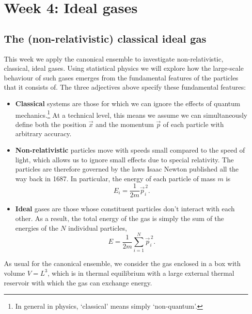 \renewcommand{\thisweek}{MATH327 Week 4}
\renewcommand{\moddate}{Last modified 31 Jan.~2021}
\setcounter{section}{4}
\setcounter{subsection}{0}
{}
\section*{Week 4: Ideal gases}

\subsection{The (non-relativistic) classical ideal gas}
This week we apply the canonical ensemble to investigate non-relativistic, classical, ideal gases.
Using statistical physics we will explore how the large-scale behaviour of such gases emerges from the fundamental features of the particles that it consists of.
The three adjectives above specify these fundamental features: \\[-24 pt]
\begin{itemize}
  \item \textbf{Classical} systems are those for which we can ignore the effects of quantum mechanics.\footnote{In general in physics, `classical' means simply `non-quantum'.}
        At a technical level, this means we assume we can simultaneously define both the position $\vec x$ and the momentum $\vec p$ of each particle with arbitrary accuracy.
  \item \textbf{Non-relativistic} particles move with speeds small compared to the speed of light, which allows us to ignore small effects due to special relativity.
        The particles are therefore governed by the laws Isaac Newton published all the way back in 1687.
        In particular, the energy of each particle of mass $m$ is
        \begin{equation*}
          E_i = \frac{1}{2m} \vec{p}_i^{\,2}.
        \end{equation*}
  \item \textbf{Ideal} gases are those whose constituent particles don't interact with each other.
        As a result, the total energy of the gas is simply the sum of the energies of the $N$ individual particles,
        \begin{equation}
          E = \frac{1}{2m} \sum_{i = 1}^N \vec{p}_i^{\,2}.
        \end{equation}
\end{itemize}

As usual for the canonical ensemble, we consider the gas enclosed in a box with volume $V = L^3$, which is in thermal equilibrium with a large external thermal reservoir with which the gas can exchange energy.



